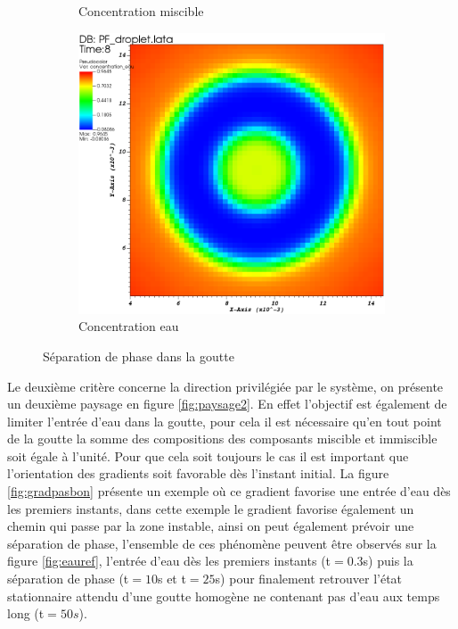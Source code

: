 \begin{figure}[H]
\begin{subfigure}[H]{0.32\textwidth}
 		\caption{Concentration miscible}
 		\label{fig:y equals x}
 	\end{subfigure}
 	\begin{subfigure}[H]{0.32\textwidth}
 		\centering
 		\includegraphics[width=\textwidth]{figure/paysage_base/visit0002.png}
 		\caption{Concentration eau}
 		\label{fig:y equals x}
 	\end{subfigure}
 	\caption{Séparation de phase dans la goutte}
 	\label{land_base_sep}
 \end{figure} \vspace{-0.5cm}

Le deuxième critère concerne la direction privilégiée par le système, on présente un deuxième paysage en figure \ref{fig:paysage2}. En effet l'objectif est également de limiter l'entrée d'eau dans la goutte, pour cela il est nécessaire qu'en tout point de la goutte la somme des compositions des composants miscible et immiscible soit égale à l'unité. Pour que cela soit toujours le cas il est important que l'orientation des gradients soit favorable dès l'instant initial. La figure \ref{fig:gradpasbon} présente un exemple où ce gradient favorise une entrée d'eau dès les premiers instants, dans cette exemple le gradient favorise également un chemin qui passe par la zone instable, ainsi on peut également prévoir une séparation de phase, l'ensemble de ces phénomène peuvent être observés sur la figure \ref{fig:eauref}, l'entrée d'eau dès les premiers instants (t$=0.3$s) puis la séparation de phase (t$=10$s et t$=25$s) pour finalement retrouver l'état stationnaire attendu d'une goutte homogène ne contenant pas d'eau aux temps long (t$=50s$).

